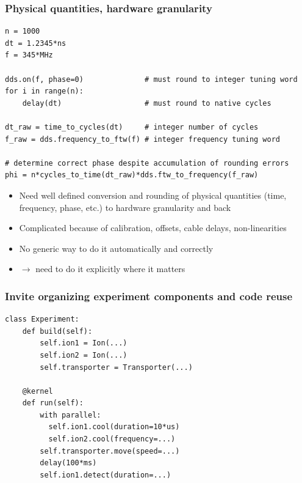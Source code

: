 \documentclass[final,presentation,compress]{beamer}
\begin{document}
\begin{frame}[fragile]
  \frametitle{Physical quantities, hardware granularity}
  \footnotesize
  \begin{verbatim}
n = 1000
dt = 1.2345*ns
f = 345*MHz

dds.on(f, phase=0)              # must round to integer tuning word
for i in range(n):
    delay(dt)                   # must round to native cycles

dt_raw = time_to_cycles(dt)     # integer number of cycles
f_raw = dds.frequency_to_ftw(f) # integer frequency tuning word

# determine correct phase despite accumulation of rounding errors
phi = n*cycles_to_time(dt_raw)*dds.ftw_to_frequency(f_raw)
  \end{verbatim}

  \begin{itemize}
    \item Need well defined conversion and rounding of physical quantities
      (time, frequency, phase, etc.) to hardware granularity and back
    \item Complicated because of calibration, offsets, cable delays,
      non-linearities
    \item No generic way to do it automatically and correctly
    \item $\rightarrow$ need to do it explicitly where it matters
  \end{itemize}
\end{frame}


\begin{frame}[fragile]
  \frametitle{Invite organizing experiment components and code reuse}
  \footnotesize

  \begin{verbatim}
class Experiment:
    def build(self):
        self.ion1 = Ion(...)
        self.ion2 = Ion(...)
        self.transporter = Transporter(...)

    @kernel
    def run(self):
        with parallel:
          self.ion1.cool(duration=10*us)
          self.ion2.cool(frequency=...)
        self.transporter.move(speed=...)
        delay(100*ms)
        self.ion1.detect(duration=...)
  \end{verbatim}
\end{frame}
\end{document}
